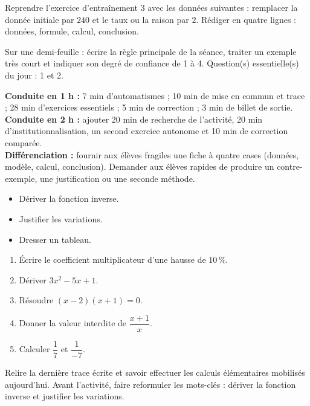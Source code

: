
\begin{dm}Reprendre l'exercice d'entraînement 3 avec les données suivantes : remplacer la donnée initiale par $240$ et le taux ou la raison par $2$. Rédiger en quatre lignes : données, formule, calcul, conclusion.\end{dm}

\begin{sortie}Sur une demi-feuille : écrire la règle principale de la séance, traiter un exemple très court et indiquer son degré de confiance de 1 à 4. Question(s) essentielle(s) du jour : 1 et 2.\end{sortie}

\ifprof
\begin{methode}
\textbf{Conduite en 1 h :} 7 min d'automatismes ; 10 min de mise en commun et trace ; 28 min d'exercices essentiels ; 5 min de correction ; 3 min de billet de sortie.\\
\textbf{Conduite en 2 h :} ajouter 20 min de recherche de l'activité, 20 min d'institutionnalisation, un second exercice autonome et 10 min de correction comparée.\\
\textbf{Différenciation :} fournir aux élèves fragiles une fiche à quatre cases (données, modèle, calcul, conclusion). Demander aux élèves rapides de produire un contre-exemple, une justification ou une seconde méthode.
\end{methode}
\fi
{}
\begin{objectifs}\begin{itemize}\item Dériver la fonction inverse.\item Justifier les variations.\item Dresser un tableau.\end{itemize}\end{objectifs}
\begin{automatismes}\begin{enumerate}\item Écrire le coefficient multiplicateur d'une hausse de $10\,\%$. \item Dériver $3x^2-5x+1$. \item Résoudre $(x-2)(x+1)=0$. \item Donner la valeur interdite de $\dfrac{x+1}{x}$. \item Calculer $\dfrac1{7}$ et $\dfrac1{-7}$. \end{enumerate}\end{automatismes}
\begin{prerequis}Relire la dernière trace écrite et savoir effectuer les calculs élémentaires mobilisés aujourd'hui. Avant l'activité, faire reformuler les mots-clés : dériver la fonction inverse et justifier les variations.\end{prerequis}

